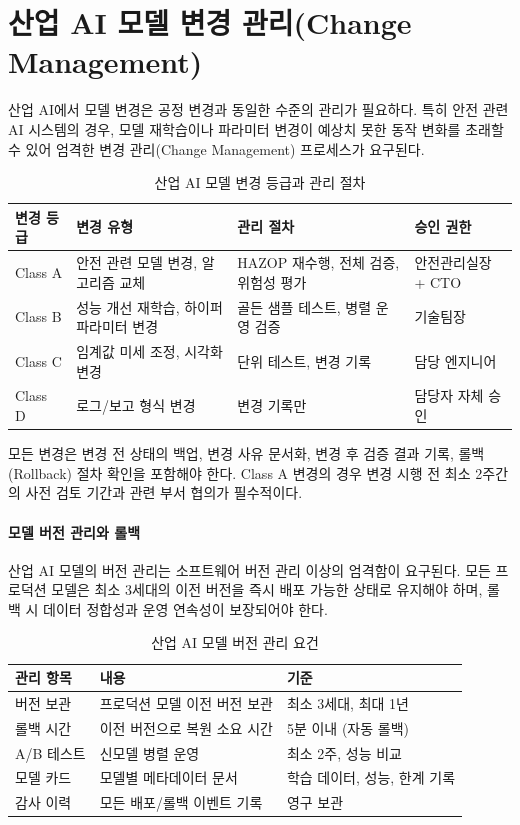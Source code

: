 \section{산업 AI 모델 변경 관리(Change Management)}
\label{sec:19.6}

산업 AI에서 모델 변경은 공정 변경과 동일한 수준의 관리가 필요하다. 특히 안전 관련 AI 시스템의 경우, 모델 재학습이나 파라미터 변경이 예상치 못한 동작 변화를 초래할 수 있어 엄격한 변경 관리(Change Management) 프로세스가 요구된다.

\begin{table}[htbp]
\centering
\caption{산업 AI 모델 변경 등급과 관리 절차}
\label{tab:19_change}
\begin{tabularx}{\textwidth}{p{2cm}p{3cm}Xp{3cm}}
\toprule
\textbf{변경 등급} & \textbf{변경 유형} & \textbf{관리 절차} & \textbf{승인 권한} \\
\midrule
Class A & 안전 관련 모델 변경, 알고리즘 교체 & HAZOP 재수행, 전체 검증, 위험성 평가 & 안전관리실장 + CTO \\
Class B & 성능 개선 재학습, 하이퍼파라미터 변경 & 골든 샘플 테스트, 병렬 운영 검증 & 기술팀장 \\
Class C & 임계값 미세 조정, 시각화 변경 & 단위 테스트, 변경 기록 & 담당 엔지니어 \\
Class D & 로그/보고 형식 변경 & 변경 기록만 & 담당자 자체 승인 \\
\bottomrule
\end{tabularx}
\end{table}

모든 변경은 변경 전 상태의 백업, 변경 사유 문서화, 변경 후 검증 결과 기록, 롤백(Rollback) 절차 확인을 포함해야 한다. Class A 변경의 경우 변경 시행 전 최소 2주간의 사전 검토 기간과 관련 부서 협의가 필수적이다.

\paragraph{모델 버전 관리와 롤백}

산업 AI 모델의 버전 관리는 소프트웨어 버전 관리 이상의 엄격함이 요구된다. 모든 프로덕션 모델은 최소 3세대의 이전 버전을 즉시 배포 가능한 상태로 유지해야 하며, 롤백 시 데이터 정합성과 운영 연속성이 보장되어야 한다.

\begin{table}[htbp]
\centering
\caption{산업 AI 모델 버전 관리 요건}
\label{tab:19_version}
\begin{tabularx}{\textwidth}{p{3cm}Xp{3.5cm}}
\toprule
\textbf{관리 항목} & \textbf{내용} & \textbf{기준} \\
\midrule
버전 보관 & 프로덕션 모델 이전 버전 보관 & 최소 3세대, 최대 1년 \\
롤백 시간 & 이전 버전으로 복원 소요 시간 & 5분 이내 (자동 롤백) \\
A/B 테스트 & 신모델 병렬 운영 & 최소 2주, 성능 비교 \\
모델 카드 & 모델별 메타데이터 문서 & 학습 데이터, 성능, 한계 기록 \\
감사 이력 & 모든 배포/롤백 이벤트 기록 & 영구 보관 \\
\bottomrule
\end{tabularx}
\end{table}

